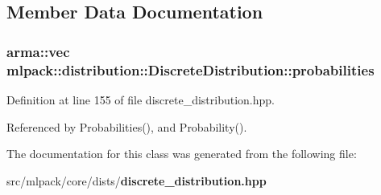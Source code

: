 \subsection{Member Data Documentation}
\subsubsection[{probabilities}]{\setlength{\rightskip}{0pt plus 5cm}arma\-::vec mlpack\-::distribution\-::\-Discrete\-Distribution\-::probabilities\hspace{0.3cm}{\ttfamily [private]}}\label{classmlpack_1_1distribution_1_1DiscreteDistribution_a18eb832a43efb009b1982ed6ff101fb9}


Definition at line 155 of file discrete\-\_\-distribution.\-hpp.



Referenced by Probabilities(), and Probability().



The documentation for this class was generated from the following file\-:\begin{DoxyCompactItemize}
\item 
src/mlpack/core/dists/{\bf discrete\-\_\-distribution.\-hpp}\end{DoxyCompactItemize}

